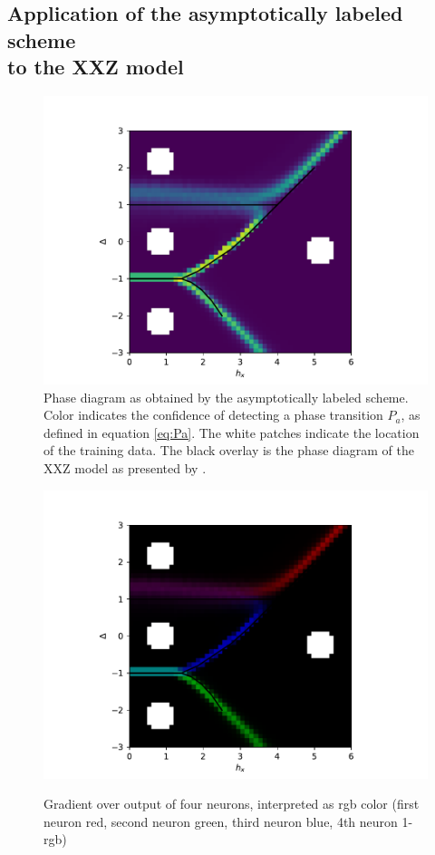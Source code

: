 \documentclass[prl, reprint, twocolumn]{revtex4-1}
\begin{document}
	\subsection{Application of the asymptotically labeled scheme \\ to the XXZ model}
	\begin{figure}[h]
		\includegraphics[width=\columnwidth]{3_6_Weak4PhaseDetection2DEdges_30_20190109}
		
		\caption{Phase diagram as obtained by the asymptotically labeled scheme. Color indicates the confidence of detecting a phase transition $P_a$, as defined in equation \ref{eq:Pa}. The white patches indicate the location of the training data. The black overlay is the phase diagram of the XXZ model as presented by \cite{Dmitriev2002}.}
		\label{fig:asymptotic:base}
	\end{figure}
	\begin{figure}[h]
		\includegraphics[width=\columnwidth]{3_6_Weak4PhaseDetection2DEdges_20_20190109}
		\label{fig:asymptotic:base1}
		\caption{Gradient over output of four neurons, interpreted as rgb color (first neuron red, second neuron green, third neuron blue, 4th neuron 1-rgb)}
	\end{figure}
	
\end{document}
